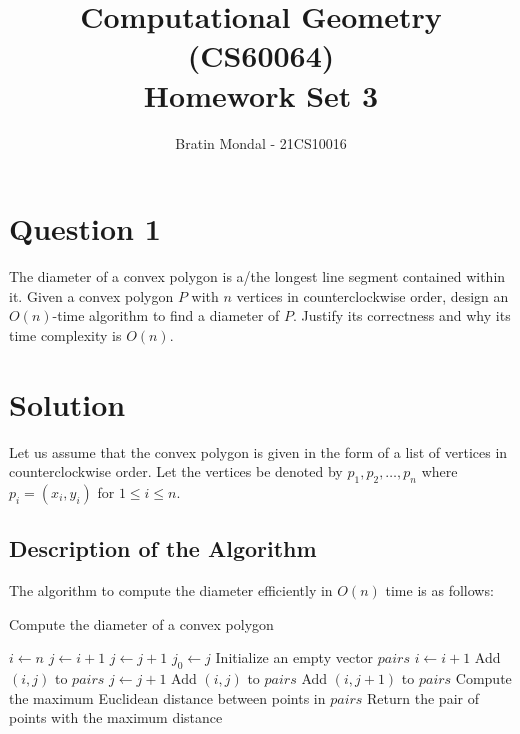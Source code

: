\documentclass[12pt]{article}
\title{Computational Geometry (CS60064)\\ Homework Set 3}
\author{
    Bratin Mondal - 21CS10016
}
\date{}
\begin{document}
\maketitle

\section*{Question 1}
The diameter of a convex polygon is a/the longest line segment contained within it. Given a convex polygon \( P \) with \( n \) vertices in counterclockwise order, design an \( O(n) \)-time algorithm to find a diameter of \( P \). Justify its correctness and why its time complexity is \( O(n) \).

\section*{Solution}
Let us assume that the convex polygon is given in the form of a list of vertices in counterclockwise order. Let the vertices be denoted by \( p_1, p_2, \ldots, p_n \) where \( p_i = (x_i, y_i) \) for \( 1 \leq i \leq n \).

\subsection*{Description of the Algorithm}

The algorithm to compute the diameter efficiently in \( O(n) \) time is as follows:

\begin{algorithm}[H]
\caption{Compute the diameter of a convex polygon}
\begin{algorithmic}[1]
\STATE $i \leftarrow n$
\STATE $j \leftarrow i + 1$
    \STATE $j \leftarrow j + 1$
\ENDWHILE
\STATE $j_0 \leftarrow j$
\STATE Initialize an empty vector $pairs$
    \STATE $i \leftarrow i + 1$
    \STATE Add $(i, j)$ to $pairs$
        \STATE $j \leftarrow j + 1$
            \STATE Add $(i, j)$ to $pairs$
        \ENDIF
    \ENDWHILE
            \STATE Add $(i, j+1)$ to $pairs$
        \ENDIF
    \ENDIF
\ENDWHILE
\STATE Compute the maximum Euclidean distance between points in $pairs$
\STATE Return the pair of points with the maximum distance
\end{algorithmic}
\end{algorithm}
\end{document}
